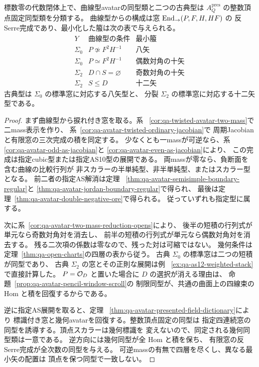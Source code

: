 \begin{corollary}[指定AS表示と幾何avatarの四層]
\label{cor:qa-avatar-four-stratum-dictionary}
標数零の代数閉体上で、曲線型avatarの同型類と二つの古典型は
$A_Q^{\mathrm{pres}}$ の整数頂点固定同型類を分類する。
曲線型からの構成は窓 $\operatorname{End}_{\to}(P,F,H,HF)$ の
反Serre完成であり、最小化した箙は次の表で与えられる。
\[
\begin{array}{c|l|l}
Y & \text{曲線型の条件} & \text{最小箙} \\ \hline
\Sigma_0 & P\not\simeq F^2H^{-1} & \text{八矢} \\
\Sigma_0 & P\simeq F^2H^{-1} & \text{偶数対角の十矢} \\
\Sigma_2 & D\cap S=\varnothing & \text{奇数対角の十矢} \\
\Sigma_2 & S\le D & \text{十二矢}
\end{array}
\]
古典型は $\Sigma_0$ の標準窓に対応する八矢型と、
分裂 $\Sigma_2$ の標準窓に対応する十二矢型である。
\end{corollary}
\begin{proof}
まず曲線型から捩れ付き窓を取る。系~
\ref{cor:qa-twisted-avatar-two-mass}で二mass表示を作り、
系~\ref{cor:qa-avatar-twisted-ordinary-jacobian}で
周期Jacobianと有限窓の三次完成の積を同定する。
少なくとも一massが可逆なら、系~
\ref{cor:qa-avatar-odd-as-jacobian}と
\ref{cor:qa-avatar-even-as-jacobian}により、
この完成は指定cubic型または指定AS10型の展開である。
両massが零なら、負断面を含む曲線の比較行列が
非スカラーの半単純型、非半単純型、またはスカラー型となる。
前二者の指定AS解消は定理~
\ref{thm:qa-avatar-semisimple-boundary-regular}と
\ref{thm:qa-avatar-jordan-boundary-regular}で得られ、
最後は定理~\ref{thm:qa-avatar-double-negative-ore}で得られる。
従っていずれも指定型に属する。

次に系~\ref{cor:qa-avatar-two-mass-reduction-opens}により、
後半の短積の行列式が単元なら奇数対角対を消去し、
前半の短積の行列式が単元なら偶数対角対を消去する。
残る二次項の係数は零なので、残った対は可縮ではない。
幾何条件は定理~\ref{thm:qa-open-charts}の四層の表から従う。
古典 $\Sigma_0$ の標準窓は二つの短積が同型であり、
古典 $\Sigma_2$ の窓とその正則な展開は例~
\ref{ex:qa-as12-weighted-stack}で直接計算した。
$P=\mathcal O_D$ と置いた場合に $D$ の選択が消える理由は、
命題~\ref{prop:qa-avatar-pencil-window-scroll}の
制限同型が、共通の曲面上の四線束の Hom と積を回復するからである。

逆に指定AS展開を取ると、定理~
\ref{thm:qa-avatar-presented-field-dictionary}により
標識付き窓と幾何avatarを回復する。整数頂点固定の同型は
指定四連続窓の同型を誘導する。頂点スカラーは幾何標識を
変えないので、同定される幾何同型類は一意である。
逆方向には幾何同型が全 Hom と積を保ち、
有限窓の反Serre完成が全次数の同型を与える。
可逆massの有無で四層を尽くし、異なる最小矢の配置は
頂点を保つ同型で一致しない。
\end{proof}

